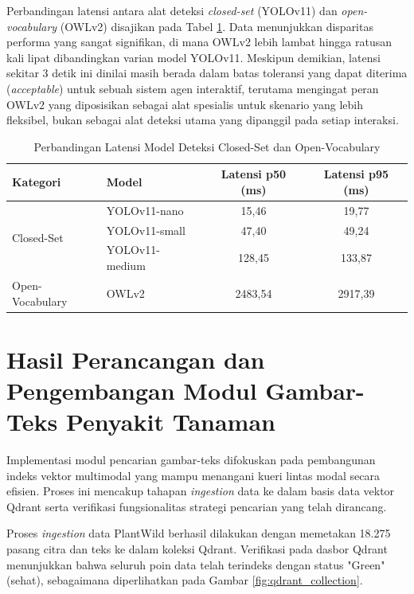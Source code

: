 Perbandingan latensi antara alat deteksi \textit{closed-set} (YOLOv11) dan \textit{open- \allowbreak vocabulary} (OWLv2) disajikan pada Tabel \ref{tab:latency_comparison}. Data menunjukkan disparitas performa yang sangat signifikan, di mana OWLv2 lebih lambat hingga ratusan kali lipat dibandingkan varian model YOLOv11. Meskipun demikian, latensi sekitar 3 detik ini dinilai masih berada dalam batas toleransi yang dapat diterima (\textit{acceptable}) untuk sebuah sistem agen interaktif, terutama mengingat peran OWLv2 yang diposisikan sebagai alat spesialis untuk skenario yang lebih fleksibel, bukan sebagai alat deteksi utama yang dipanggil pada setiap interaksi.

\begin{table}[H]
    \centering
    \caption{Perbandingan Latensi Model Deteksi Closed-Set dan Open-Vocabulary}
    \label{tab:latency_comparison}
    \small
    \begin{tabular}{|l|l|c|c|}
    \hline
    \textbf{Kategori} & \textbf{Model} & \textbf{Latensi p50 (ms)} & \textbf{Latensi p95 (ms)} \\ \hline
    \multirow{3}{*}{Closed-Set} & YOLOv11-nano & 15,46 & 19,77 \\ \cline{2-4} 
     & YOLOv11-small & 47,40 & 49,24 \\ \cline{2-4} 
     & YOLOv11-medium & 128,45 & 133,87 \\ \hline
    Open-Vocabulary & OWLv2 & 2483,54 & 2917,39 \\ \hline
    \end{tabular}
\end{table}


\section{Hasil Perancangan dan Pengembangan Modul Gambar-Teks Penyakit Tanaman}
Implementasi modul pencarian gambar-teks difokuskan pada pembangunan indeks vektor multimodal yang mampu menangani kueri lintas modal secara efisien. Proses ini mencakup tahapan \textit{ingestion} data ke dalam basis data vektor Qdrant serta verifikasi fungsionalitas strategi pencarian yang telah dirancang.

Proses \textit{ingestion} data PlantWild berhasil dilakukan dengan memetakan 18.275 pasang citra dan teks ke dalam koleksi Qdrant. Verifikasi pada dasbor Qdrant menunjukkan bahwa seluruh poin data telah terindeks dengan status "Green" (sehat), sebagaimana diperlihatkan pada Gambar \ref{fig:qdrant_collection}.

